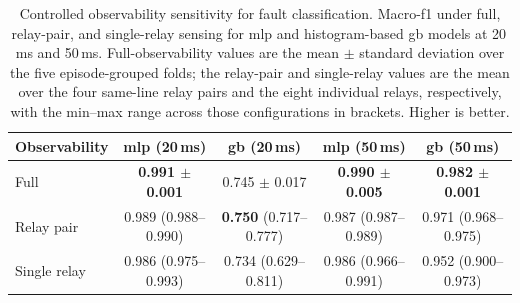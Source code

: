 \begin{table}[pos=t]
\caption{Controlled observability sensitivity for fault classification. Macro-\ac{f1} under full, relay-pair, and single-relay sensing for \ac{mlp} and histogram-based \ac{gb} models at 20\,ms and 50\,ms. Full-observability values are the mean $\pm$ standard deviation over the five episode-grouped folds; the relay-pair and single-relay values are the mean over the four same-line relay pairs and the eight individual relays, respectively, with the min--max range across those configurations in brackets. Higher is better.}
\small
\label{tab:fc_observability}
\centering
\begin{tabular}{lcccc}
\toprule
\bfseries Observability & \bfseries \ac{mlp} (20\,ms) & \bfseries \ac{gb} (20\,ms) & \bfseries \ac{mlp} (50\,ms) & \bfseries \ac{gb} (50\,ms) \\
\midrule
Full         & \textbf{0.991 $\pm$ 0.001} & 0.745 $\pm$ 0.017 & \textbf{0.990 $\pm$ 0.005} & \textbf{0.982 $\pm$ 0.001} \\
Relay pair   & 0.989 (0.988--0.990) & \textbf{0.750} (0.717--0.777) & 0.987 (0.987--0.989) & 0.971 (0.968--0.975) \\
Single relay & 0.986 (0.975--0.993) & 0.734 (0.629--0.811) & 0.986 (0.966--0.991) & 0.952 (0.900--0.973) \\
\bottomrule
\end{tabular}
\end{table}
